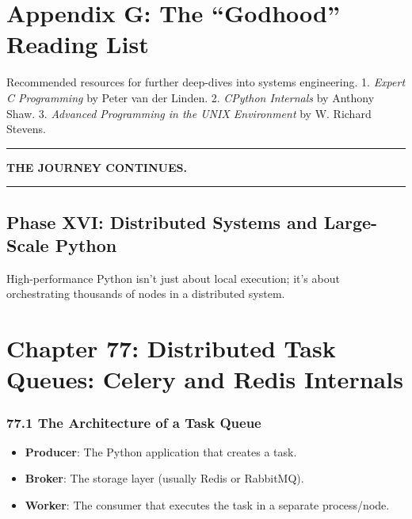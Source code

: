 \hypertarget{appendix-g-the-godhood-reading-list}{%
\chapter{Appendix G: The ``Godhood'' Reading
List}\label{appendix-g-the-godhood-reading-list}}

Recommended resources for further deep-dives into systems engineering.
1. \emph{Expert C Programming} by Peter van der Linden. 2. \emph{CPython
Internals} by Anthony Shaw. 3. \emph{Advanced Programming in the UNIX
Environment} by W. Richard Stevens.

\begin{center}\rule{0.5\linewidth}{0.5pt}\end{center}

\textbf{THE JOURNEY CONTINUES.}

\begin{center}\rule{0.5\linewidth}{0.5pt}\end{center}

\hypertarget{phase-xvi-distributed-systems-and-large-scale-python}{%
\section{Phase XVI: Distributed Systems and Large-Scale
Python}\label{phase-xvi-distributed-systems-and-large-scale-python}}

High-performance Python isn't just about local execution; it's about
orchestrating thousands of nodes in a distributed system.

\hypertarget{chapter-77-distributed-task-queues-celery-and-redis-internals}{%
\chapter{Chapter 77: Distributed Task Queues: Celery and Redis
Internals}\label{chapter-77-distributed-task-queues-celery-and-redis-internals}}

\hypertarget{the-architecture-of-a-task-queue}{%
\subsection{77.1 The Architecture of a Task
Queue}\label{the-architecture-of-a-task-queue}}

\begin{itemize}
\tightlist
\item
  \textbf{Producer}: The Python application that creates a task.
\item
  \textbf{Broker}: The storage layer (usually Redis or RabbitMQ).
\item
  \textbf{Worker}: The consumer that executes the task in a separate
  process/node.
\end{itemize}

